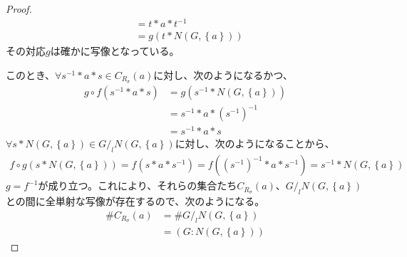 \documentclass[dvipdfmx]{jsarticle}
\begin{document}
\begin{proof}
\begin{align*}
&= t*a*t^{- 1}\\
&= g\left( t*N\left( G,\left\{ a \right\} \right) \right)
\end{align*}
その対応$g$は確かに写像となっている。\par
このとき、$\forall s^{- 1}*a*s \in C_{R_{\sigma}}(a)$に対し、次のようになるかつ、
\begin{align*}
g \circ f\left( s^{- 1}*a*s \right) &= g\left( s^{- 1}*N\left( G,\left\{ a \right\} \right) \right)\\
&= s^{- 1}*a*\left( s^{- 1} \right)^{- 1}\\
&= s^{- 1}*a*s
\end{align*}
$\forall s*N\left( G,\left\{ a \right\} \right) \in {G}/_l {N\left( G,\left\{ a \right\} \right)}$に対し、次のようになることから、
\begin{align*}
f \circ g\left( s*N\left( G,\left\{ a \right\} \right) \right) = f\left( s*a*s^{- 1} \right) = f\left( \left( s^{- 1} \right)^{- 1}*a*s^{- 1} \right) = s^{- 1}*N\left( G,\left\{ a \right\} \right)
\end{align*}
$g = f^{- 1}$が成り立つ。これにより、それらの集合たち$C_{R_{\sigma}}(a)$、${G}/_l {N\left( G,\left\{ a \right\} \right)} $との間に全単射な写像が存在するので、次のようになる。
\begin{align*}
\#{C_{R_{\sigma}}(a)} &= \#{G}/_l {N\left( G,\left\{ a \right\} \right)}\\
&= \left( G:N\left( G,\left\{ a \right\} \right) \right)
\end{align*}
\end{proof}
\end{document}

